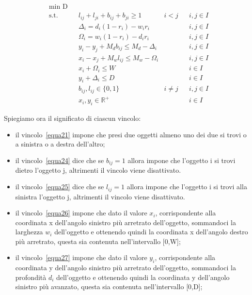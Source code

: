 \begin{align}
	& \underset{}{\text{min D}}\\
	  & \text{s.t.} &   & l_{ij} + l_{ji} + b_{ij} + b_{ji} \geq 1   & i < j    &   & i,j \in I \label{equa21} \\
	  &             &   & \Delta_i = d_i (1 - r_i) - w_i r_i         &          &   & i,j \in I \label{equa22} \\
	  &             &   & \Omega_i = w_i (1 - r_i) - d_i r_i         &          &   & i,j \in I \label{equa23} \\
	  &             &   & y_i - y_j + M_d b_{ij} \leq M_d - \Delta_i &          &   & i,j \in I \label{equa24} \\
	  &             &   & x_i - x_j + M_w l_{ij} \leq M_w - \Omega_i &          &   & i,j \in I \label{equa25} \\
	  &             &   & x_i + \Omega_i \leq W                      &          &   & i \in I   \label{equa26} \\
	  &             &   & y_i + \Delta_i \leq D                      &          &   & i \in I   \label{equa27} \\
	  &             &   & b_{ij}, l_{ij} \in \{0,1\}                 & i \neq j &   & i,j \in I \label{equa28} \\
	  &             &   & x_{i}, y_{i} \in \mathbb{R}^{+}            &          &   & i \in I  \label{equa29}  
\end{align}

Spiegiamo ora il significato di ciascun vincolo:
\begin{itemize}
	\item il vincolo~\eqref{equa21} impone che presi due oggetti almeno uno dei due si trovi o a sinistra o a destra dell'altro;
	\item il vincolo~\eqref{equa24} dice che se $b_{ij} = 1$ allora impone che l'oggetto i si trovi dietro l'oggetto j, altrimenti il vincolo viene disattivato. 
	\item il vincolo~\eqref{equa25} dice che se $l_{ij} = 1$ allora impone che l'oggetto i si trovi alla sinistra l'oggetto j, altrimenti il vincolo viene disattivato. 
	\item il vincolo~\eqref{equa26} impone che dato il valore $x_i$, corrispondente alla coordinata x dell'angolo sinistro più arretrato dell'oggetto, sommandoci la larghezza $w_i$ dell'oggetto e ottenendo quindi la coordinata x dell'angolo destro più arretrato, questa sia contenuta nell'intervallo [0,W];
	\item il vincolo~\eqref{equa27} impone che dato il valore $y_i$, corrispondente alla coordinata y dell'angolo sinistro più arretrato dell'oggetto, sommandoci la profondità $d_i$ dell'oggetto e ottenendo quindi la coordinata y dell'angolo sinistro più avanzato, questa sia contenuta nell'intervallo [0,D];
\end{itemize}

